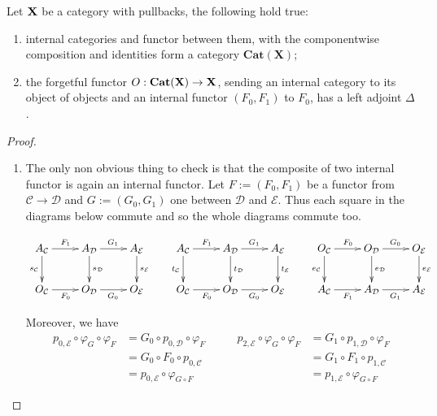 \documentclass[a4paper,UKenglish,cleveref,pdftex,thm-restate,numberwithinsect]{lipics-v2021}
\newcommand{\cat}[1]{\ensuremath{\mathbf{#1}}}
\newcommand{\cate}[1]{\mathbf{Cat}(\cat{#1})}
\def\X{\textbf {\textup{X}}}
\begin{document}
\begin{lemma}\label{lem:cose}
Let $\X$ be a category with pullbacks, the following hold true:
\begin{enumerate}
	\item  internal categories and functor between them, with the componentwise composition and identities form a category $\cate{X}$;
	\item the forgetful functor $O:\cate{X}\to \X$, sending an internal category to its object of objects and an internal functor $(F_0, F_1)$ to $F_0$, has a left adjoint $\Delta$. 
\end{enumerate}
\end{lemma}
\begin{proof}\begin{enumerate}
	\item  The only non obvious thing to check is that the composite of two internal functor is again an internal functor. Let $F:=(F_0, F_1)$ be a functor from $\mathcal{C}\to \mathcal{D}$ and $G:=(G_0, G_1)$ one between $\mathcal{D}$ and $\mathcal{E}$. Thus each square in the diagrams below commute and so the whole diagrams commute too. 
	
		\[\xymatrix{A_{\mathcal{C}} \ar[r]^{F_{1}}  \ar[d]_{s_{\mathcal{C}}}& A_{\mathcal{D}} \ar[d]^{s_{\mathcal{D}}} \ar[r]^{G_1}& A_{\mathcal{E}} \ar[d]^{s_{\mathcal{E}}}& A_{\mathcal{C}} \ar[d]_{t_{\mathcal{C}}} \ar[r]^{F_1} & A_{\mathcal{D}}  \ar[d]^{t_{\mathcal{D}}}\ar[r]^{G_1}& A_{\mathcal{E}} \ar[d]^{t_{\mathcal{E}}} &  O_{\mathcal{C}} \ar[d]_{e_{\mathcal{C}}} \ar[r]^{F_0}& O_{\mathcal{D}} \ar[d]^{e_{\mathcal{D}}}  \ar[r]^{G_0}& O_{\mathcal{E}} \ar[d]^{e_{\mathcal{E}}}\\ O_{\mathcal{C}} \ar[r]_{F_0} & O_{\mathcal{D}} \ar[r]_{G_0}& O_{\mathcal{E}} &O_{\mathcal{C}} \ar[r]_{F_0} & O_{\mathcal{D}} \ar[r]_{G_0}& O_{\mathcal{E}} &A_{\mathcal{C}} \ar[r]_{F_1} & A_{\mathcal{D}} \ar[r]_{G_1} & A_{\mathcal{E}}}\]
		
		Moreover, we have
		\[\begin{split}
			p_{0, \mathcal{E}}\circ \varphi_{G}\circ \varphi_F &= G_0\circ p_{0, \mathcal{D}} \circ \varphi_F \\&=G_0\circ F_0\circ p_{0, \mathcal{C}}\\&= p_{0, \mathcal{E}}\circ \varphi_{G\circ F} 
		\end{split}\qquad 
		\begin{split}
		p_{2, \mathcal{E}}\circ \varphi_{G}\circ \varphi_F &= G_1\circ p_{1, \mathcal{D}} \circ \varphi_F \\&=G_1\circ F_1\circ p_{1, \mathcal{C}}\\&= p_{1, \mathcal{E}}\circ \varphi_{G\circ F} 
		\end{split}\]
		

\end{enumerate}
\end{proof}
\end{document}
